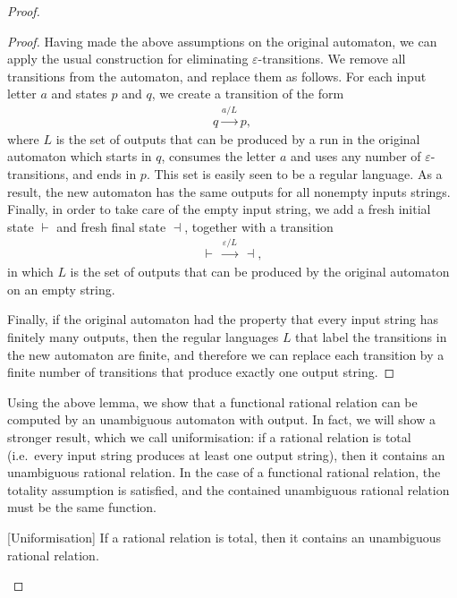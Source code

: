 \begin{proof}
\begin{proof}
        Having made the above assumptions on the original automaton, we can apply the usual construction for eliminating $\varepsilon$-transitions. We remove all transitions from the automaton, and replace them as follows. For each input letter $a$ and states $p$ and $q$, we create a transition of the form   
            \begin{align*}
            q \xrightarrow {a / L} p,
            \end{align*}
            where   $L$ is the set of outputs that can be produced by a run in the original automaton which starts in $q$, consumes the letter $a$ and  uses any number of  $\varepsilon$-transitions, and ends in $p$. This set  is easily seen to be a regular language. As a result, the new automaton has the same outputs for all nonempty inputs strings. Finally, in order to take care of the empty input string, we add a fresh initial state $\vdash$ and fresh final state $\dashv$, together with a transition 
            \begin{align*}
            \vdash\  \xrightarrow {\varepsilon / L }\ \dashv,
            \end{align*}
            in which $L$ is the set of outputs that can be produced by the original automaton on an empty string. 

            Finally, if the original automaton had the property that every input string has finitely many outputs, then the regular languages $L$ that label the transitions in the new automaton are finite, and therefore we can replace each transition by a finite number of transitions that produce exactly one output string. 
        \end{proof}

    Using the above lemma, we show that a functional rational relation can be computed by an unambiguous automaton with output. 
    In fact, we will show a stronger result, which we call uniformisation: if a rational relation is total (i.e.~every input string produces at least one output string), then it contains an unambiguous rational relation. In the case of a functional rational relation, the totality assumption is satisfied, and the contained unambiguous rational relation must be the same function.

    \begin{lemma}\label{lem:uniformisation}
        [Uniformisation] If a rational relation is total, then it contains an unambiguous rational relation.
    \end{lemma}


\end{proof}
